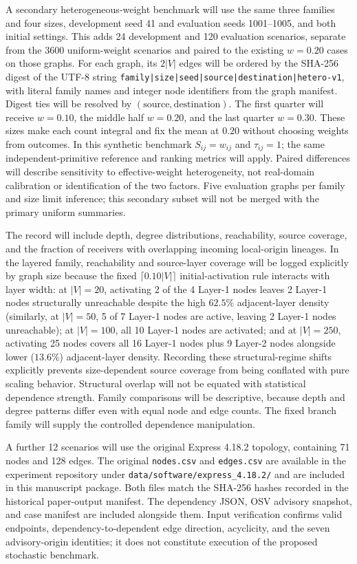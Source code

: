 A secondary heterogeneous-weight benchmark will use the same three families
and four sizes, development seed 41 and evaluation seeds 1001--1005, and both
initial settings. This adds 24 development and 120 evaluation scenarios,
separate from the 3600 uniform-weight scenarios and paired to the existing
$w=0.20$ cases on those graphs. For each graph, its $2|V|$ edges will be
ordered by the SHA-256 digest of the UTF-8 string
\texttt{family|size|seed|source|destination|hetero-v1}, with literal
family names and integer node identifiers from the graph manifest.
Digest ties will be resolved by $(\text{source},\text{destination})$.
The first quarter will receive $w=0.10$, the middle
half $w=0.20$, and the last quarter $w=0.30$. These sizes make each count
integral and fix the mean at $0.20$ without choosing weights from outcomes.
In this synthetic benchmark $S_{ij}=w_{ij}$ and $\tau_{ij}=1$; the same
independent-primitive reference and ranking metrics will apply. Paired
differences will describe sensitivity to effective-weight heterogeneity,
not real-domain calibration or identification of the two factors. Five
evaluation graphs per family and size limit inference; this secondary subset
will not be merged with the primary uniform summaries.

The record will include depth, degree distributions, reachability, source
coverage, and the fraction of receivers with overlapping incoming local-origin
lineages. In the layered family, reachability and source-layer coverage will
be logged explicitly by graph size because the fixed $\lceil0.10|V|\rceil$
initial-activation rule interacts with layer width: at $|V|=20$, activating
2 of the 4 Layer-1 nodes leaves 2 Layer-1 nodes structurally unreachable
despite the high $62.5\%$ adjacent-layer density (similarly, at $|V|=50$,
5 of 7 Layer-1 nodes are active, leaving 2 Layer-1 nodes unreachable); at
$|V|=100$, all 10 Layer-1 nodes are activated; and at $|V|=250$, activating
25 nodes covers all 16 Layer-1 nodes plus 9 Layer-2 nodes alongside lower
($13.6\%$) adjacent-layer density. Recording these structural-regime shifts
explicitly prevents size-dependent source coverage from being conflated
with pure scaling behavior. Structural overlap will not be equated with
statistical dependence strength. Family comparisons will be descriptive,
because depth and degree patterns differ even with equal node and edge
counts. The fixed branch family will supply the controlled dependence
manipulation.

A further 12 scenarios will use the original Express 4.18.2 topology,
containing 71 nodes and 128 edges. The original \texttt{nodes.csv} and
\texttt{edges.csv} are available in the experiment repository under
\texttt{data/software/express\_4.18.2/} and are included in this manuscript
package. Both files match the SHA-256 hashes recorded in the historical
paper-output manifest. The dependency JSON, OSV advisory snapshot, and
case manifest are included alongside them. Input verification confirms
valid endpoints, dependency-to-dependent edge direction, acyclicity,
and the seven advisory-origin identities; it does not constitute execution
of the proposed stochastic benchmark.

